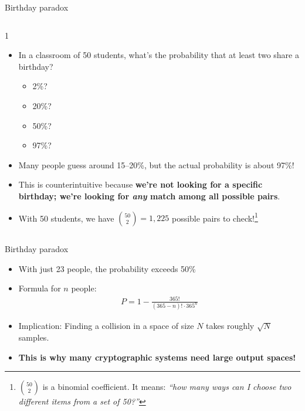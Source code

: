 \ifdefined\PRESENTATION\else\PassOptionsToClass{handout}{beamer}\fi\documentclass[aspectratio=169, lualatex]{beamer}
\begin{document}
\begin{frame}{Birthday paradox}
	\begin{columns}[c]
		\begin{column}{1\textwidth}
			\begin{itemize}[<+->]
				\item In a classroom of 50 students, what's the probability that at least two share a birthday?
				      \begin{itemize}
					      \item 2\%?
					      \item 20\%?
					      \item 50\%?
					      \item 97\%?
				      \end{itemize}
				\item Many people guess around 15--20\%, but the actual probability is about 97\%!
				\item This is counterintuitive because \textbf{we're not looking for a specific birthday; we're looking for \textit{any} match among all possible pairs}.
				\item With 50 students, we have $\binom{50}{2} = 1{,}225$ possible pairs to check!\footnote{$\binom{50}{2}$ is a binomial coefficient. It means: \textit{``how many ways can I choose two different items from a set of 50?''}}
			\end{itemize}
		\end{column}
	\end{columns}
\end{frame}

\begin{frame}{Birthday paradox}
	\begin{itemize}
		\item With just 23 people, the probability exceeds 50\%
		\item Formula for $n$ people:
		      \begin{align*}
			      P = 1 - \frac{365!}{(365-n)! \cdot 365^n}
		      \end{align*}
		\item Implication: Finding a collision in a space of size $N$ takes roughly $\sqrt{N}$ samples.
		\item \textbf{This is why many cryptographic systems need large output spaces!}
	\end{itemize}
\end{frame}
\end{document}
